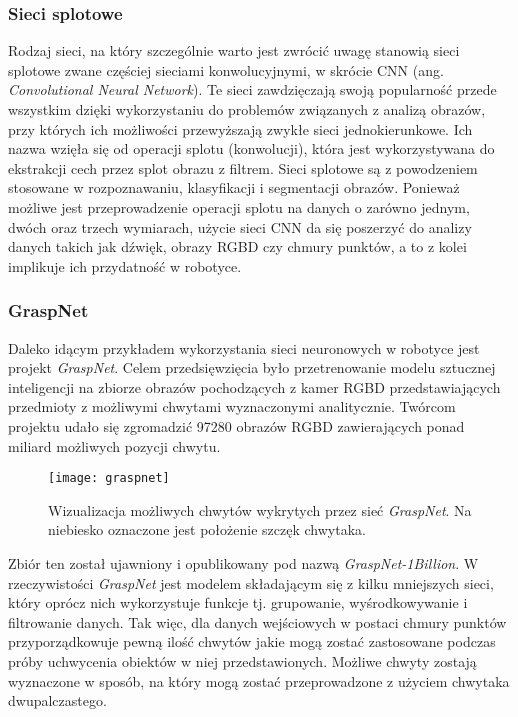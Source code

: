 \documentclass[12pt]{article}
\begin{document}
\subsubsection*{Sieci splotowe}
Rodzaj sieci, na który szczególnie warto jest zwrócić uwagę stanowią sieci splotowe zwane częściej sieciami konwolucyjnymi, w skrócie CNN (ang. \emph{Convolutional Neural Network}). Te sieci zawdzięczają swoją popularność przede wszystkim dzięki wykorzystaniu do problemów związanych z analizą obrazów, przy których ich możliwości przewyższają zwykłe sieci jednokierunkowe. Ich nazwa wzięła się od operacji splotu (konwolucji), która jest wykorzystywana do ekstrakcji cech przez splot obrazu z filtrem. Sieci splotowe są z powodzeniem stosowane w rozpoznawaniu, klasyfikacji i segmentacji obrazów. Ponieważ możliwe jest przeprowadzenie operacji splotu na danych o zarówno jednym, dwóch oraz trzech wymiarach, użycie sieci CNN da się poszerzyć do analizy danych takich jak dźwięk, obrazy RGBD czy chmury punktów, a to z kolei implikuje ich przydatność w robotyce.

\subsubsection*{GraspNet}
Daleko idącym przykładem wykorzystania sieci neuronowych w robotyce jest projekt \emph{GraspNet}. Celem przedsięwzięcia było przetrenowanie modelu sztucznej inteligencji na zbiorze obrazów pochodzących z kamer RGBD przedstawiających przedmioty z możliwymi chwytami wyznaczonymi analitycznie. Twórcom projektu udało się zgromadzić 97280 obrazów RGBD zawierających ponad miliard możliwych pozycji chwytu.

\begin{figure}[h]
\centering
\texttt{[image: graspnet]}
\caption{Wizualizacja możliwych chwytów wykrytych przez sieć \emph{GraspNet}. Na niebiesko oznaczone jest położenie szczęk chwytaka.}
\end{figure}

Zbiór ten został ujawniony i opublikowany pod nazwą \emph{GraspNet-1Billion}. W rzeczywistości \emph{GraspNet} jest modelem składającym się z kilku mniejszych sieci, który oprócz nich wykorzystuje funkcje tj. grupowanie, wyśrodkowywanie i filtrowanie danych. Tak więc, dla danych wejściowych w postaci chmury punktów przyporządkowuje pewną ilość chwytów jakie mogą zostać zastosowane podczas próby uchwycenia obiektów w niej przedstawionych. Możliwe chwyty zostają wyznaczone w sposób, na który mogą zostać przeprowadzone z użyciem chwytaka dwupalczastego.
\end{document}
